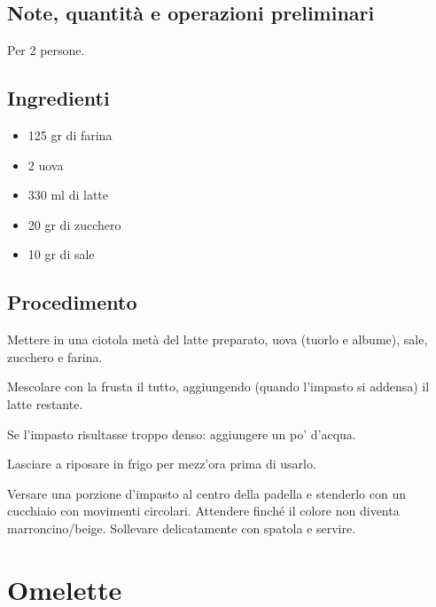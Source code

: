 \documentclass[12pt]{article}
\begin{document}
\subsection*{Note, quantità e operazioni preliminari}
Per 2 persone.

\bigskip
\bigskip

\begin{multicols}{2}
\subsection*{Ingredienti}
\begin{itemize}
	\item 125 gr di farina
	\item 2 uova
	\item 330 ml di latte
	\item 20 gr di zucchero
	\item 10 gr di sale
\end{itemize}

\vspace*{\fill}

\columnbreak
\subsection*{Procedimento}

Mettere in una ciotola metà del latte preparato, uova (tuorlo e albume), sale, zucchero e farina.
\medskip

Mescolare con la frusta il tutto, aggiungendo (quando l'impasto si addensa) il latte restante.
\medskip

Se l'impasto risultasse troppo denso: aggiungere un po' d'acqua.
\medskip

Lasciare a riposare in frigo per mezz'ora prima di usarlo.
\medskip

Versare una porzione d'impasto al centro della padella e stenderlo con un cucchiaio con movimenti circolari. 
Attendere finché il colore non diventa marroncino/beige. 
Sollevare delicatamente con spatola e servire.

\end{multicols}

\newpage


\section{Omelette}
\end{document}
